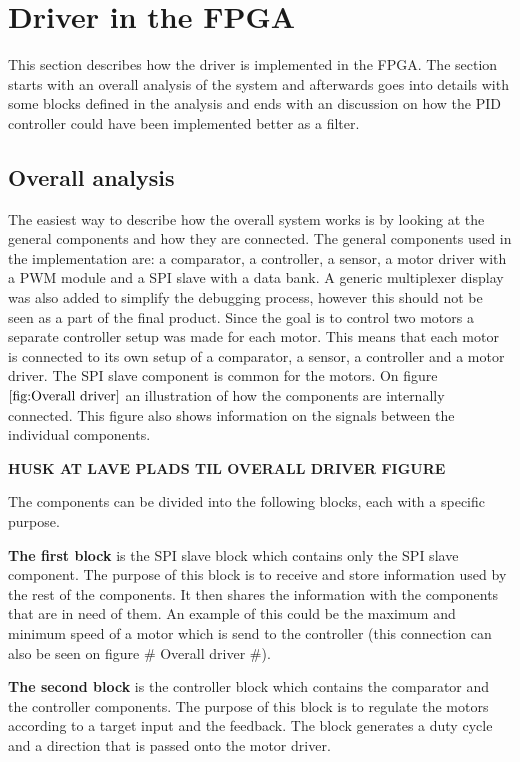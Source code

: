 \section{Driver in the FPGA}
This section describes how the driver is implemented in the FPGA. The section starts with an overall analysis of the system and afterwards goes into details with some blocks defined in the analysis and ends with an discussion on how the PID controller could have been implemented better as a filter.

\subsection{Overall analysis}

The easiest way to describe how the overall system works is by looking at the general components and how they are connected. The general components used in the implementation are: a comparator, a controller, a sensor, a motor driver with a PWM module and a SPI slave with a data bank. A generic multiplexer display was also added to simplify the debugging process, however this should not be seen as a part of the final product.
Since the goal is to control two motors a separate controller setup was made for each motor. This means that each motor is connected to its own setup of a comparator, a sensor, a controller and a motor driver. The SPI slave component is common for the motors.
On figure $\ref{fig:Overall driver}$ an illustration of how the components are internally connected. This figure also shows information on the signals between the individual components.


\textbf{HUSK AT LAVE PLADS TIL OVERALL DRIVER FIGURE}


The components can be divided into the following blocks, each with a specific purpose. 

\textbf{The first block} is the SPI slave block which contains only the SPI slave component. The purpose of this block is to receive and store information used by the rest of the components. It then shares the information with the components that are in need of them. An example of this could be the maximum and minimum speed of a motor which is send to the controller (this connection can also be seen on figure \# Overall driver \#).

\textbf{The second block} is the controller block which contains the comparator and the controller components. The purpose of this block is to regulate the motors according to a target input and the feedback. The block generates a duty cycle and a direction that is passed onto the motor driver.

